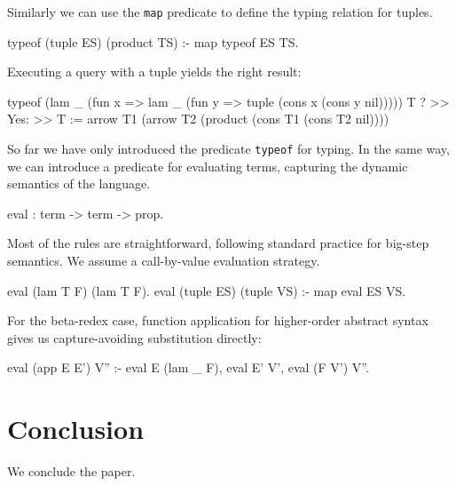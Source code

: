 \documentclass[format=acmlarge,review,anonymous]{acmart}\settopmatter{printfolios=true}
\begin{document}
Similarly we can use the \texttt{map} predicate to define the typing relation for tuples. 

\begin{codequote}
typeof (tuple ES) (product TS) :-
  map typeof ES TS.
\end{codequote}

Executing a query with a tuple yields the right result:

\begin{codequote}
typeof (lam _ (fun x => lam _ (fun y => tuple (cons x (cons y nil))))) T ?
>> Yes:
>> T := arrow T1 (arrow T2 (product (cons T1 (cons T2 nil))))
\end{codequote}

So far we have only introduced the predicate \texttt{typeof} for typing. In the same way, we can introduce
a predicate for evaluating terms, capturing the dynamic semantics of the language.

\begin{codequote}
eval : term -> term -> prop.
\end{codequote}

Most of the rules are straightforward, following standard practice for big-step semantics.  We
assume a call-by-value evaluation strategy.

\begin{codequote}
eval (lam T F) (lam T F).
eval (tuple ES) (tuple VS) :- map eval ES VS.
\end{codequote}

For the beta-redex case, function application for higher-order abstract syntax gives us
capture-avoiding substitution directly:

\begin{codequote}
eval (app E E') V'' :-
  eval E (lam _ F), eval E' V', eval (F V') V''.
\end{codequote}


\section{Conclusion}

\TODO{} We conclude the paper.


\end{document}
